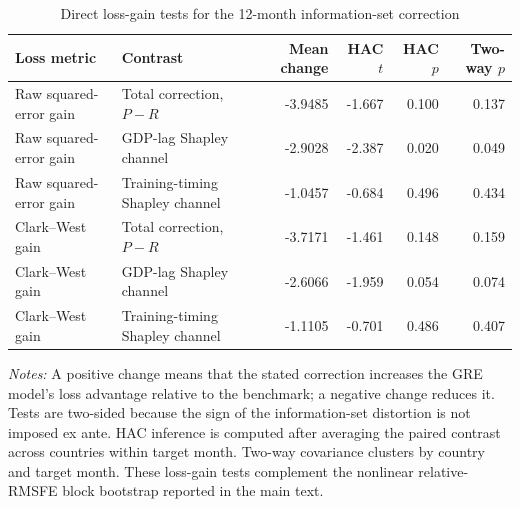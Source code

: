 \begin{table}[htbp]
\centering\scriptsize
\caption{Direct loss-gain tests for the 12-month information-set correction}
\label{stab:channel_loss_tests}
\begin{tabular}{llrrrr}
\toprule
Loss metric & Contrast & Mean change & HAC $t$ & HAC $p$ & Two-way $p$ \\
\midrule
Raw squared-error gain & Total correction, $P-R$ & -3.9485 & -1.667 & 0.100 & 0.137 \\
Raw squared-error gain & GDP-lag Shapley channel & -2.9028 & -2.387 & 0.020 & 0.049 \\
Raw squared-error gain & Training-timing Shapley channel & -1.0457 & -0.684 & 0.496 & 0.434 \\
Clark--West gain & Total correction, $P-R$ & -3.7171 & -1.461 & 0.148 & 0.159 \\
Clark--West gain & GDP-lag Shapley channel & -2.6066 & -1.959 & 0.054 & 0.074 \\
Clark--West gain & Training-timing Shapley channel & -1.1105 & -0.701 & 0.486 & 0.407 \\
\bottomrule
\end{tabular}
\begin{minipage}{0.97\textwidth}\footnotesize\textit{Notes:} A positive change means that the stated correction increases the GRE model's loss advantage relative to the benchmark; a negative change reduces it. Tests are two-sided because the sign of the information-set distortion is not imposed ex ante. HAC inference is computed after averaging the paired contrast across countries within target month. Two-way covariance clusters by country and target month. These loss-gain tests complement the nonlinear relative-RMSFE block bootstrap reported in the main text.\end{minipage}
\end{table}
